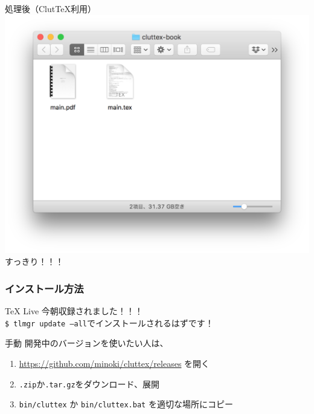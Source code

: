 \documentclass[aspectratio=169]{beamer}
\begin{document}
\begin{frame}[plain]
  \begin{block}{処理後（Clut\TeX{}利用）}
    \centering
    \includegraphics[height=0.6\paperheight]{latex-after-cluttex.png}\\
    \LARGE すっきり！！！
  \end{block}
\end{frame}
\begin{frame}\frametitle{インストール方法}
  \begin{block}{\TeX{} Live}
    今朝収録されました！！！\\
    \texttt{\$ tlmgr update --all}でインストールされるはずです！
  \end{block}

  \begin{block}{手動}
    開発中のバージョンを使いたい人は、
    \begin{enumerate}
    \item \url{https://github.com/minoki/cluttex/releases} を開く
    \item \texttt{.zip}か\texttt{.tar.gz}をダウンロード、展開
    \item \texttt{bin/cluttex} か \texttt{bin/cluttex.bat} を適切な場所にコピー
    \end{enumerate}
  \end{block}
\end{frame}
\end{document}
